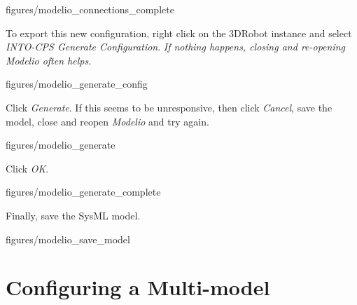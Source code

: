 \documentclass[11pt,a4paper]{../tutorial}
\begin{document}
\begin{instructions}
\begin{annotation}[width=0.7\linewidth,trim=0 400 0 0,clip]{figures/modelio_connections_complete}
    \end{annotation}
\newpage

\item To export this new configuration, right click on the 3DRobot instance and select \emph{INTO-CPS \menusep Generate Configuration}. \emph{If nothing happens, closing and re-opening Modelio often helps.}

    \begin{annotation}[width=0.7\linewidth,trim=290 350 50 400,clip]{figures/modelio_generate_config}
    \end{annotation}

\item Click \emph{Generate}. If this seems to be unresponsive, then click \emph{Cancel}, save the model, close and reopen \emph{Modelio} and try again.

    \begin{annotation}[width=0.3\linewidth,trim=0 0 0 0,clip]{figures/modelio_generate}
    \end{annotation}

\item Click \emph{OK}.

\begin{annotation}[width=0.22\linewidth,trim=0 0 0 0,clip]{figures/modelio_generate_complete}
    \end{annotation}

\item Finally, save the SysML model.

\begin{annotation}[width=0.5\linewidth,trim=0 760 500 0,clip]{figures/modelio_save_model}
    \end{annotation}

\end{instructions}

\newpage
\section{Configuring a Multi-model}
\end{document}
